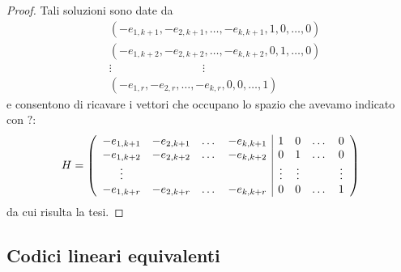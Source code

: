 \begin{proof}
   Tali soluzioni sono  date da
   \begin{align*}
      &(-e_{1,k+1}, -e_{2,k+1}, \dots , -e_{k,k+1}, 1, 0 , \dots , 0 ) \\
      &(-e_{1,k+2}, -e_{2,k+2}, \dots , -e_{k,k+2}, 0, 1 , \dots , 0 ) \\
      &\vdots \qquad \qquad \qquad \qquad \vdots \\
      &(-e_{1,r}, -e_{2,r}, \dots , -e_{k,r}, 0, 0 , \dots , 1 ) 
   \end{align*}
    e consentono di ricavare i vettori che occupano lo spazio che avevamo indicato con $?$:
   \begin{align*}
      H=
      \left(
      \begin{array} {c c c c | c c c c }
      -e_{1,k+1} & -e_{2,k+1} & \dots & -e_{k,k+1} & 1 & 0 & \dots & 0   \\
      -e_{1,k+2} & -e_{2,k+2} & \dots & -e_{k,k+2} & 0 & 1 & \dots & 0   \\
       \vdots & & &  & \vdots & \vdots  &  &  \vdots   \\
      -e_{1,k+r} & -e_{2,k+r} & \dots & -e_{k,k+r} & 0 & 0 & \dots & 1   \\  
      \end{array}
      \right)
   \end{align*}    
    da cui risulta la tesi.
\end{proof}


\subsection{Codici lineari equivalenti}

